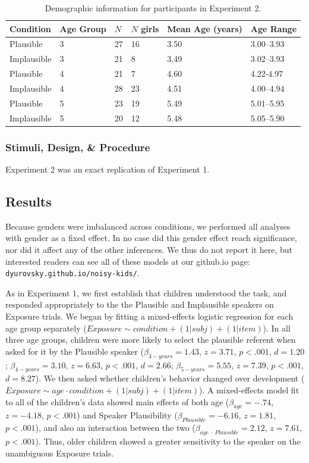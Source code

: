 \documentclass[man,floatsintext]{apa6}
\begin{document}
\begin{table}[tb]
\begin{center}
\begin{tabular}{llllll}
 Condition & Age Group & $N$ & $N$ girls & Mean Age (years) & Age Range\\
  \hline
  Plausible & 3 & 27 & 16 & 3.50 & 3.00--3.93 \\
  Implausible & 3 & 21 & 8 & 3.49 & 3.02--3.93 \\
  Plausible & 4 & 21 & 7 & 4.60 & 4.22-4.97 \\
  Implausible & 4 & 28 & 23 & 4.51 & 4.00--4.94 \\
  Plausible & 5 & 23 & 19 & 5.49 & 5.01--5.95 \\
  Implausible & 5 & 20 & 12 & 5.48 & 5.05--5.90 \\
   \hline
\end{tabular}\end{center}
\vspace{6pt}
\caption{\label{tab:exp2_demos}Demographic information for participants in Experiment 2.}
\end{table}

\subsubsection{Stimuli, Design, \& Procedure}

Experiment 2 was an exact replication of Experiment 1.

\subsection{Results}

Because genders were imbalanced across conditions, we performed all analyses with gender as a fixed effect. In no case did this gender effect reach significance, nor did it affect any of the other inferences. We thus do not report it here, but interested readers can see all of these models at our github.io page: {\small \tt{dyurovsky.github.io/noisy-kids/}}.

As in Experiment 1, we first establish that children understood the task, and responded appropriately to the  the Plausible and Implausible speakers on Exposure trials. We began by fitting a mixed-effects logistic regression for each age group separately ($Exposure \sim condition + (1|subj) + (1|item)$). In all three age groups, children were more likely to select the plausible referent when asked for it by the Plausible speaker ($\beta_{3-years} = 1.43$, $z = 3.71$, $p < .001$, $d = 1.20$; $\beta_{4-years} = 3.10$, $z = 6.63$, $p < .001$, $d = 2.66$; $\beta_{5-years} = 5.55$, $z = 7.39$, $p < .001$, $d = 8.27$). We then asked whether children's behavior changed over development ($Exposure \sim age \cdot condition + (1|subj) + (1|item)$). A mixed-effects model fit to all of the children's data showed main effects of both age ($\beta_{age} = -.74$, $z = -4.18$, $p < .001$) and Speaker Plausibility ($\beta_{Plausible} = -6.16$, $z = 1.81$, $p < .001$), and also an interaction between the two ($\beta_{age \: \cdot \: Plausible} = 2.12$, $z = 7.61$, $p < .001$). Thus, older children showed a greater sensitivity to the speaker on the unambiguous Exposure trials.
\end{document}
